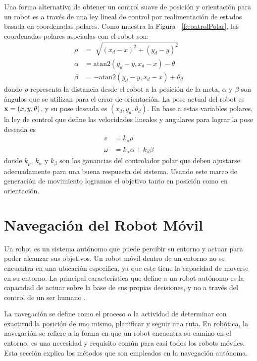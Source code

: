 Una forma alternativa de obtener un control suave de posici\'on y orientaci\'on 
para un robot es a trav\'es de una ley lineal de control por realimentaci\'on 
de estados basada en coordenadas polares. Como muestra la Figura ~\ref{f:controlPolar}, 
las coordenadas polares asociadas con el robot son:
\begin{align*}
\rho &= \sqrt[]{(x_{d} - x)^2 + (y_{d} - y)^2} \\
\alpha &= \text{atan2}(y_{d} - y, x_{d} - x) - \theta \\
\beta &= -\text{atan2}(y_{d} - y, x_{d} - x) + \theta_{d}
\end{align*}
donde $\rho$ representa la distancia desde el robot a la posici\'on de la 
meta, $\alpha$ y $\beta$ son \'angulos que se utilizan para el error de 
orientaci\'on. La pose actual del robot es $\mathbf x=(x,y,\theta)$, y su pose 
deseada es $(x_{d},y_{d},\theta_{d})$. En base a estas variables polares, la 
ley de control que define las velocidades lineales y angulares para lograr 
la pose deseada es 
\begin{align}
\label{eqn:v}
v &= k_{\rho}\rho \\
\label{eqn:w}
\omega &= k_{\alpha}\alpha + k_{\beta}\beta
\end{align}
donde $k_{\rho}$, $k_{\alpha}$ y $k_{\beta}$ son las ganancias del controlador 
polar que deben ajustarse adecuadamente para una buena respuesta del sistema. Usando 
este marco de generaci\'on de movimiento logramos el objetivo tanto en posici\'on 
como en orientaci\'on.

\section{Navegaci\'on del Robot M\'ovil}

Un robot es un sistema aut\'onomo que puede percibir su entorno y actuar para poder
alcanzar sus objetivos. Un robot m\'ovil dentro de un entorno no se encuentra en una 
ubicaci\'on espec\'ifica, ya que este tiene la capacidad de moverse en su entorno. La 
principal caracter\'istica que define a un robot aut\'onomo es la capacidad de actuar 
sobre la base de sus propias decisiones, y no a trav\'es del control de un ser 
humano \cite{mataric2007robotics}.

La navegaci\'on se define como el proceso o la actividad de determinar con exactitud 
la posici\'on de uno mismo, planificar y seguir una ruta. En rob\'otica, la navegaci\'on 
se refiere a la forma en que un robot encuentra su camino en el entorno, es una necesidad 
y requisito com\'un para casi todos los robots m\'oviles. Esta secci\'on explica los 
m\'etodos que son empleados en la navegaci\'on aut\'onoma.


